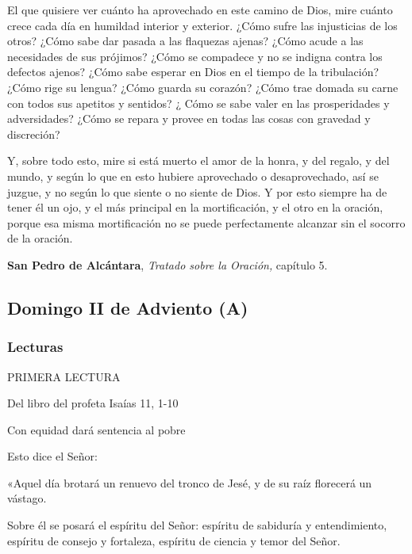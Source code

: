 \documentclass[]{article}
\begin{document}
El que quisiere ver cuánto ha aprovechado en este camino de Dios, mire cuánto crece cada día en humildad interior y exterior. ¿Cómo sufre las injusticias de los otros? ¿Cómo sabe dar pasada a las flaquezas ajenas? ¿Cómo acude a las necesidades de sus prójimos? ¿Cómo se compadece y no se indigna contra los defectos ajenos? ¿Cómo sabe esperar en Dios en el tiempo de la tribulación? ¿Cómo rige su lengua? ¿Cómo guarda su corazón? ¿Cómo trae domada su carne con todos sus apetitos y sentidos? ¿ Cómo se sabe valer en las prosperidades y adversidades? ¿Cómo se repara y provee en todas las cosas con gravedad y discreción?

Y, sobre todo esto, mire si está muerto el amor de la honra, y del regalo, y del mundo, y según lo que en esto hubiere aprovechado o desaprovechado, así se juzgue, y no según lo que siente o no siente de Dios. Y por esto siempre ha de tener él un ojo, y el más principal en la mortificación, y el otro en la oración, porque esa misma mortificación no se puede perfectamente alcanzar sin el socorro de la oración.

\textbf{San Pedro de Alcántara}, \emph{Tratado sobre la Oración,} capítulo 5.\strut



\subsection{}\label{section}

\subsection{Domingo II de Adviento (A)}\label{domingo-ii-de-adviento-a}

\subsubsection{Lecturas}\label{lecturas-1}

PRIMERA LECTURA

Del libro del profeta Isaías 11, 1-10

Con equidad dará sentencia al pobre

Esto dice el Señor:

«Aquel día brotará un renuevo del tronco de Jesé, y de su raíz florecerá
un vástago.

Sobre él se posará el espíritu del Señor: espíritu de sabiduría y
entendimiento, espíritu de consejo y fortaleza, espíritu de ciencia y
temor del Señor.
\end{document}
